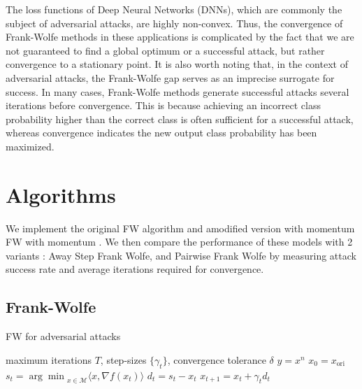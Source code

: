 \documentclass{article}
\begin{document}
The loss functions of Deep Neural Networks (DNNs), which are commonly the subject of adversarial attacks, are highly non-convex. Thus, the convergence of Frank-Wolfe methods in these applications is complicated by the fact that we are not guaranteed to find a global optimum or a successful attack, but rather convergence to a stationary point. 
It is also worth noting that, in the context of adversarial attacks, the Frank-Wolfe gap serves as an imprecise surrogate for success. In many cases, Frank-Wolfe methods generate successful attacks several iterations before convergence. This is because achieving an incorrect class probability higher than the correct class is often sufficient for a successful attack, whereas convergence indicates the new output class probability has been maximized.

\section{Algorithms}
We implement the original FW algorithm and amodified version with momentum FW with momentum \cite{attacks}. We then compare the performance of these models with 2 variants \cite{fw-variants}: Away Step Frank Wolfe, and Pairwise Frank Wolfe by measuring attack success rate and average iterations required for convergence.

\subsection{Frank-Wolfe}
\begin{algorithm}
\caption{FW for adversarial attacks}\label{alg:cap}
\begin{algorithmic}[1]
\Require maximum iterations $T$, step-sizes $\{\gamma_t\}$, convergence tolerance $\delta$
\Ensure $y = x^n$
\State $x_0 = x_{\text{ori}}$
	\State $s_t = {\arg \min}_{x\in\mathcal{M}} \langle x, \nabla f(x_t)\rangle$ 
	\State $d_t = s_t - x_t$
	\State $x_{t+1} = x_t + \gamma_t d_t$
	  \hfill {}
	\EndIf
\EndFor
\end{algorithmic}
\end{algorithm}
\end{document}
